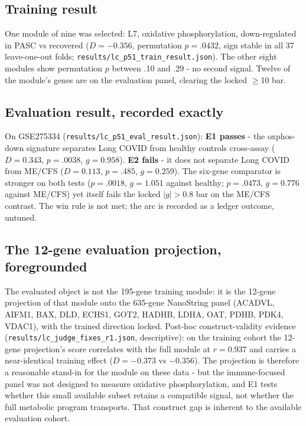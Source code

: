 \documentclass[11pt,a4paper]{article}
\begin{document}
\subsection{Training result}
One module of nine was selected: L7, oxidative phosphorylation, down-regulated
in PASC vs recovered ($D=-0.356$, permutation $p=.0432$, sign stable in all 37
leave-one-out folds; \texttt{results/lc\_p51\_train\_result.json}). The other
eight modules show permutation $p$ between .10 and .29 - no second signal.
Twelve of the module's genes are on the evaluation panel, clearing the locked
$\geq$10 bar.

\subsection{Evaluation result, recorded exactly}
On GSE275334 (\texttt{results/lc\_p51\_eval\_result.json}): \textbf{E1 passes}
- the oxphos-down signature separates Long COVID from healthy controls
cross-assay ($D=0.343$, $p=.0038$, $g=0.958$). \textbf{E2 fails} - it does not
separate Long COVID from ME/CFS ($D=0.113$, $p=.485$, $g=0.259$). The six-gene
comparator is stronger on both tests ($p=.0018$, $g=1.051$ against healthy;
$p=.0473$, $g=0.776$ against ME/CFS) yet itself fails the locked $|g|>0.8$ bar
on the ME/CFS contrast. The win rule is not met; the arc is recorded as a
ledger outcome, untuned.

\subsection{The 12-gene evaluation projection, foregrounded}
\label{sec:projection}
The evaluated object is not the 195-gene training module: it is the
12-gene projection of that module onto the 635-gene NanoString panel
(ACADVL, AIFM1, BAX, DLD, ECHS1, GOT2, HADHB, LDHA, OAT, PDHB, PDK4,
VDAC1), with the trained direction locked. Post-hoc construct-validity
evidence (\texttt{results/lc\_judge\_fixes\_r1.json}, descriptive): on the
training cohort the 12-gene projection's score correlates with the full
module at $r=0.937$ and carries a near-identical training effect
($D=-0.373$ vs $-0.356$). The projection is therefore a reasonable
stand-in for the module on these data - but the immune-focused panel was
not designed to measure oxidative phosphorylation, and E1 tests whether
this small available subset retains a compatible signal, not whether the
full metabolic program transports. That construct gap is inherent to the
available evaluation cohort.
\end{document}
